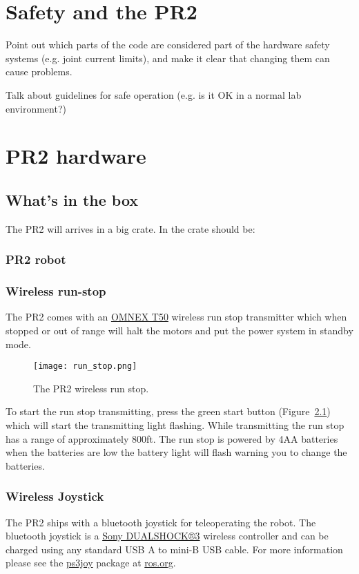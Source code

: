 \chapter{Safety and the PR2}
Point out which parts of the code are considered part of the hardware safety systems (e.g. joint current limits), and make it clear that changing them can cause problems.

Talk about guidelines for safe operation (e.g. is it OK in a normal lab environment?)

\chapter{PR2 hardware}

\section{What's in the box}
The PR2 will arrives in a big crate.  In the crate should be:
\subsection{PR2 robot}
\subsection{Wireless run-stop}
\label{wirelessrunstop}
The PR2 comes with an \href{http://www.omnexcontrols.com/products/portable/t50.html}{OMNEX T50} 
wireless run stop transmitter which when stopped or out of range will halt the motors and put the power system in standby mode. 

\begin{figure}[h]
\centering
\texttt{[image: run\_stop.png]}
\caption{The PR2 wireless run stop.}
\label{fig:runstop}
\end{figure}

To start the run stop transmitting, press the green start button (Figure~\ref{fig:runstop}) which will start the transmitting 
light flashing. While transmitting the run stop has a range of approximately 800ft. The run stop is powered by 4AA batteries 
when the batteries are low the battery light will flash warning you to change the batteries.

\subsection{Wireless Joystick}
The PR2 ships with a bluetooth joystick for teleoperating the robot. The bluetooth joystick is a 
\href{http://www.sonystyle.com/webapp/wcs/stores/servlet/ProductDisplay?catalogId=10551&storeId=10151&langId=-1&productId=8198552921665411965#additionalImage1%22}{Sony DUALSHOCK®3} 
wireless controller and can be charged using any standard USB A to mini-B USB cable. For more information please see the 
\href{http://www.ros.org/wiki/ps3joy}{ps3joy} package at \href{http://www.ros.org}{ros.org}.

